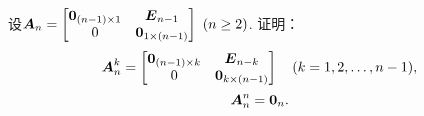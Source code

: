 \begin{example}
设\(\boldsymbol{A}_n = \begin{bmatrix}
	\boldsymbol0_{(n-1)\times1} & \boldsymbol{E}_{n-1} \\
	0 & \boldsymbol0_{1\times(n-1)}
\end{bmatrix}\ (n\geq2)\).
证明：\begin{equation*}
	\boldsymbol{A}_n^k = \begin{bmatrix}
		\boldsymbol0_{(n-1)\times k} & \boldsymbol{E}_{n-k} \\
		0 & \boldsymbol0_{k\times(n-1)}
	\end{bmatrix}
	\quad(k=1,2,\dotsc,n-1),
\end{equation*}\begin{equation*}
	\boldsymbol{A}_n^n = \boldsymbol0_n.
\end{equation*}
\end{example}
